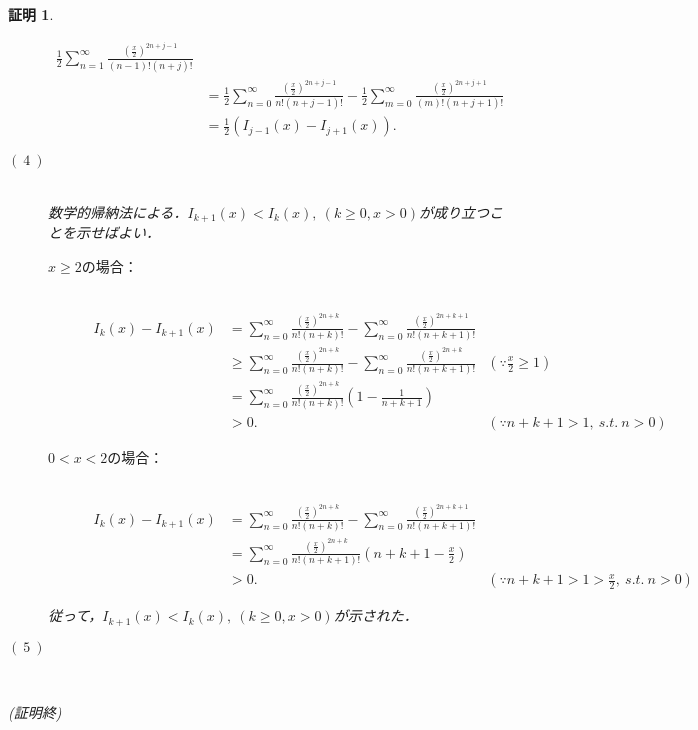 \documentclass[a4j,papersize,disablejfam,slide,14pt]{jsarticle}
\newtheorem{Proof}{証明}
\def\qed{{(証明終)}} %
\begin{document}
\begin{Proof}
\begin{description}
\begin{align}
                    	\frac{1}{2} \sum_{n=1}^{\infty} \frac{\left( \frac{x}{2} \right)^{2n+j-1}}{(n-1)!(n+j)!} \\
                    &= \frac{1}{2} \sum_{n=0}^{\infty} \frac{\left( \frac{x}{2} \right)^{2n+j-1}}{n!(n+j-1)!} -
                    	\frac{1}{2} \sum_{m=0}^{\infty} \frac{\left( \frac{x}{2} \right)^{2n+j+1}}{(m)!(n+j+1)!} \\
                    &= \frac{1}{2} (I_{j-1}(x) - I_{j+1}(x)).
                \end{align}
            \item[$(\ 4\ )$]\mbox{}\\
            	数学的帰納法による．$I_{k+1}(x) < I_k(x),\ (k \geq 0, x > 0)$が成り立つことを示せばよい．\\
                \begin{description}
                	\item[$x \geq 2$の場合：]\mbox{}\\
                		\begin{align}
                			I_k(x) - I_{k+1}(x) &= \sum_{n=0}^{\infty} \frac{\left( \frac{x}{2} \right)^{2n+k}}{n!(n+k)!} -
                    			\sum_{n=0}^{\infty} \frac{\left( \frac{x}{2} \right)^{2n+k+1}}{n!(n+k+1)!} \\
                    		&\geq \sum_{n=0}^{\infty} \frac{\left( \frac{x}{2} \right)^{2n+k}}{n!(n+k)!} -
                    			\sum_{n=0}^{\infty} \frac{\left( \frac{x}{2} \right)^{2n+k}}{n!(n+k+1)!} & (\because \frac{x}{2} \geq 1) \\
                            &= \sum_{n=0}^{\infty} \frac{\left( \frac{x}{2} \right)^{2n+k}}{n!(n+k)!} \left( 1 - \frac{1}{n+k+1} \right) \\
                            &> 0. & (\because n+k+1 > 1,\ s.t.\ n > 0)
                		\end{align}
                    \item[$0 < x < 2$の場合：]\mbox{}\\
                    	\begin{align}
                    		I_k(x) - I_{k+1}(x) &= \sum_{n=0}^{\infty} \frac{\left( \frac{x}{2} \right)^{2n+k}}{n!(n+k)!} -
                    			\sum_{n=0}^{\infty} \frac{\left( \frac{x}{2} \right)^{2n+k+1}}{n!(n+k+1)!} \\
                        	&= \sum_{n=0}^{\infty} \frac{\left( \frac{x}{2} \right)^{2n+k}}{n!(n+k+1)!} \left( n+k+1 - \frac{x}{2} \right) \\
                        	&> 0. & (\because n+k+1 > 1 > \frac{x}{2} ,\ s.t.\ n > 0)
                        \end{align}
                \end{description}
                従って，$I_{k+1}(x) < I_k(x),\ (k \geq 0, x > 0)$が示された．
            \item[$(\ 5\ )$]\mbox{}\\
            	
        \end{description}
    	\qed
    \end{Proof}
\end{document}
